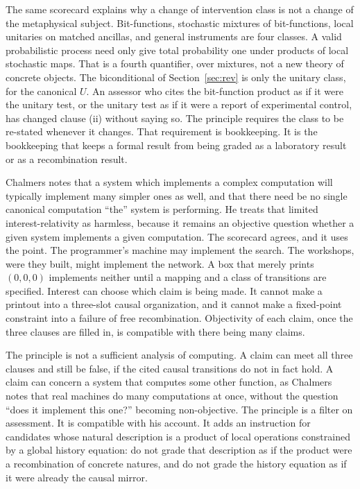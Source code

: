 \documentclass[12pt]{article}
\begin{document}
The same scorecard explains why a change of intervention class is not a change of the metaphysical subject. Bit-functions, stochastic mixtures of bit-functions, local unitaries on matched ancillas, and general instruments are four classes. A valid probabilistic process need only give total probability one under products of local stochastic maps. That is a fourth quantifier, over mixtures, not a new theory of concrete objects. The biconditional of Section~\ref{sec:rev} is only the unitary class, for the canonical \(U\). An assessor who cites the bit-function product as if it were the unitary test, or the unitary test as if it were a report of experimental control, has changed clause (ii) without saying so. The principle requires the class to be re-stated whenever it changes. That requirement is bookkeeping. It is the bookkeeping that keeps a formal result from being graded as a laboratory result or as a recombination result.

Chalmers notes that a system which implements a complex computation will typically implement many simpler ones as well, and that there need be no single canonical computation ``the'' system is performing. He treats that limited interest-relativity as harmless, because it remains an objective question whether a given system implements a given computation. The scorecard agrees, and it uses the point. The programmer's machine may implement the search. The workshops, were they built, might implement the network. A box that merely prints \((0,0,0)\) implements neither until a mapping and a class of transitions are specified. Interest can choose which claim is being made. It cannot make a printout into a three-slot causal organization, and it cannot make a fixed-point constraint into a failure of free recombination. Objectivity of each claim, once the three clauses are filled in, is compatible with there being many claims.

The principle is not a sufficient analysis of computing. A claim can meet all three clauses and still be false, if the cited causal transitions do not in fact hold. A claim can concern a system that computes some other function, as Chalmers notes that real machines do many computations at once, without the question ``does it implement this one?'' becoming non-objective. The principle is a filter on assessment. It is compatible with his account. It adds an instruction for candidates whose natural description is a product of local operations constrained by a global history equation: do not grade that description as if the product were a recombination of concrete natures, and do not grade the history equation as if it were already the causal mirror.
\end{document}

